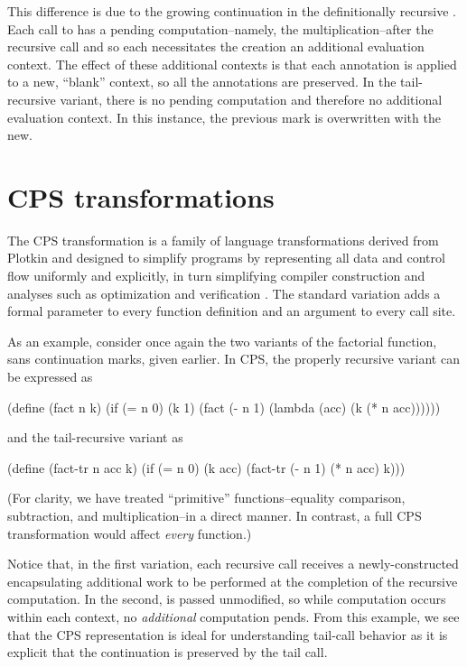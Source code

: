 \documentclass[ms,electronic,twosidetoc,letterpaper,chaptercenter,parttop]{byumsphd}
\begin{document}
This difference is due to the growing continuation in the definitionally recursive
. Each call to  has a pending computation--namely, the
multiplication--after the recursive call and so each necessitates the creation an
additional evaluation context. The effect of these additional contexts is that each
annotation is applied to a new, ``blank'' context, so all the annotations are preserved. 
In the tail-recursive variant, there is no pending computation and therefore no additional
evaluation context. In this instance, the previous mark is overwritten with the new.

\chapter{CPS transformations}

The CPS transformation is a family of language transformations derived from Plotkin
\cite{plotkin1975call} and designed to simplify  programs by representing all data and
control flow uniformly and explicitly, in turn simplifying compiler construction and
analyses such as optimization and verification \cite{sabry1994formal}. The standard
variation adds a formal parameter to every function definition and an argument to every
call site.

As an example, consider once again the two variants of the factorial function, sans
continuation marks, given earlier. In CPS, the properly recursive variant can be expressed
as
\begin{schemedisplay}
(define (fact n k) 
  (if (= n 0)
      (k 1)
      (fact (- n 1) (lambda (acc) (k (* n acc))))))
\end{schemedisplay}
and the tail-recursive variant as
\begin{schemedisplay}
(define (fact-tr n acc k)
  (if (= n 0)
      (k acc)
      (fact-tr (- n 1) (* n acc) k)))
\end{schemedisplay}
(For clarity, we have treated ``primitive'' functions--equality comparison, subtraction,
and multiplication--in a direct manner. In contrast, a full CPS transformation would
affect \emph{every} function.)

Notice that, in the first variation, each recursive call receives a newly-constructed 
encapsulating additional work to be performed at the completion of the recursive
computation. In the second,  is passed unmodified, so while computation occurs within
each context, no \emph{additional} computation pends. From this example, we see that the
CPS representation is ideal for understanding tail-call behavior as it is explicit that
the continuation is preserved by the tail call.
\end{document}
